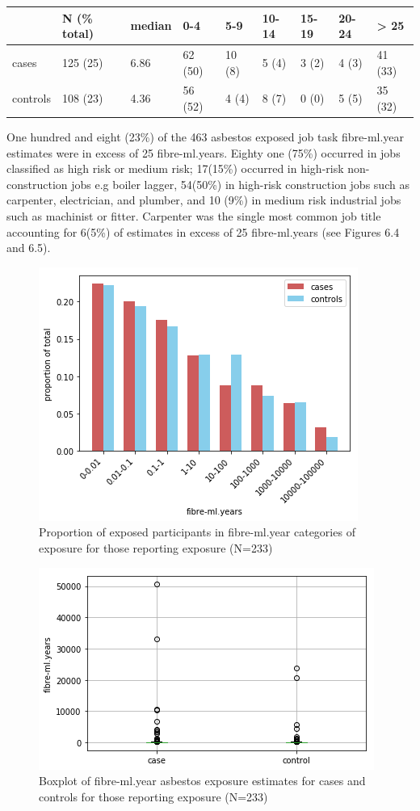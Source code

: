 \begin{longtable}[]{@{}lllllllll@{}}
\toprule
& N (\% total) & median & 0-4 & 5-9 & 10-14 & 15-19 & 20-24 &
\textgreater{} 25\tabularnewline
\midrule
\endhead
cases & 125 (25) & 6.86 & 62 (50) & 10 (8) & 5 (4) & 3 (2) & 4 (3) & 41
(33)\tabularnewline
controls & 108 (23) & 4.36 & 56 (52) & 4 (4) & 8 (7) & 0 (0) & 5 (5) &
35 (32)\tabularnewline
\bottomrule
\end{longtable}

One hundred and eight (23\%) of the 463 asbestos exposed job task
fibre-ml.year estimates were in excess of 25 fibre-ml.years. Eighty one
(75\%) occurred in jobs classified as high risk or medium risk; 17(15\%)
occurred in high-risk non-construction jobs e.g boiler lagger, 54(50\%)
in high-risk construction jobs such as carpenter, electrician, and
plumber, and 10 (9\%) in medium risk industrial jobs such as machinist
or fitter. Carpenter was the single most common job title accounting for
6(5\%) of estimates in excess of 25 fibre-ml.years (see Figures 6.4 and
6.5).

\begin{figure}
\centering
\includegraphics{source/figures/fibre.png}
\caption{Proportion of exposed participants in fibre-ml.year categories
of exposure for those reporting exposure (N=233)}
\end{figure}

\begin{figure}
\centering
\includegraphics{source/figures/fibre2.png}
\caption{Boxplot of fibre-ml.year asbestos exposure estimates for cases
and controls for those reporting exposure (N=233)}
\end{figure}

